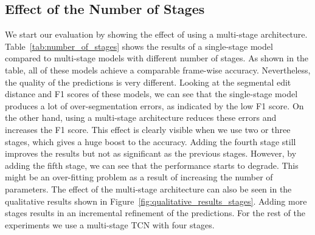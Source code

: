 \documentclass[10pt,twocolumn,letterpaper]{article}
\begin{document}
\subsection{Effect of the Number of Stages}

We start our evaluation by showing the effect of using a multi-stage 
architecture. Table~\ref{tab:number_of_stages} shows the results of a 
single-stage model compared to multi-stage models with different 
number of stages. As shown in the table, all of these models achieve 
a comparable frame-wise accuracy. Nevertheless, the quality of the 
predictions is very different. Looking at the segmental edit distance 
and F1 scores of these models, we can see that the single-stage model 
produces a lot of over-segmentation errors, as indicated by the 
low F1 score. On the other hand, using a multi-stage architecture 
reduces these errors and increases the F1 score. This effect is 
clearly visible when we use two or three stages, which gives a huge 
boost to the accuracy. Adding the fourth stage still improves the 
results but not as significant as the previous stages. However, 
by adding the fifth stage, we can see that the performance starts 
to degrade. This might be an over-fitting problem as a result of 
increasing the number of parameters. The effect of the multi-stage 
architecture can also be seen in the qualitative results shown
in Figure~\ref{fig:qualitative_results_stages}. Adding more stages 
results in an incremental refinement of the predictions. For the rest 
of the experiments we use a multi-stage TCN with four stages.

\begin{table}[tb]
\centering
{}
\caption{Effect of the number of stages on the 50Salads dataset.}
\label{tab:number_of_stages}
\end{table}
\end{document}
